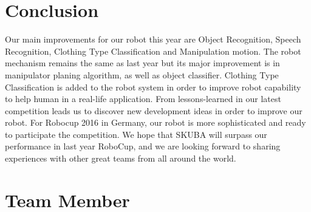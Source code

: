 \documentclass{llncs}
\begin{document}
\section{Conclusion}

Our main improvements for our robot this year are Object Recognition, Speech Recognition, Clothing Type Classification and Manipulation motion. The robot mechanism remains the same as last year but its major improvement is in manipulator planing algorithm, as well as object classifier. Clothing Type Classification is added to the robot system in order to improve robot capability to help human in a real-life application. From lessons-learned in our latest competition leads us to discover new development ideas in order to improve our robot. For Robocup 2016 in Germany, our robot is more sophisticated and ready to participate the competition. We hope that SKUBA will surpass our performance in last year RoboCup, and we are looking forward to sharing experiences with other great teams from all around the world.

\section*{Team Member}
\end{document}
